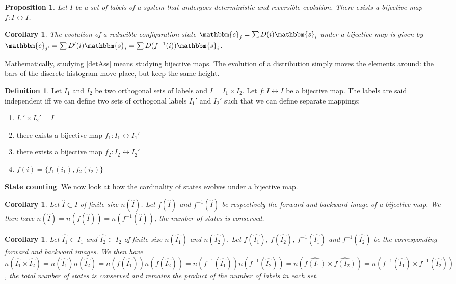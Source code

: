 \documentclass[twocolumn,floatfix,nofootinbib]{revtex4}   %
\theoremstyle{theorem}
\newtheorem{cor}[thm]{Corollary}
\newtheorem{prop}[thm]{Proposition}
\theoremstyle{definition}
\newtheorem{defn}[thm]{Definition}
\begin{document}
\begin{prop}\label{detMap}
Let $I$ be a set of labels of a system that undergoes deterministic and reversible evolution. There exists a bijective map $f:I \leftrightarrow I$.
\end{prop}

\begin{cor}\label{discreteEv}
The evolution of a reducible configuration state $\mathbbm{c}_j=\sum D(i) \mathbbm{s}_i$ under a bijective map is given by $\mathbbm{c}_{j'}=\sum D'(i) \mathbbm{s}_{i}=\sum D(f^{-1}(i)) \mathbbm{s}_{i}$.
\end{cor}

Mathematically, studying \ref{detAss} means studying bijective maps. The evolution of a distribution simply moves the elements around: the bars of the discrete histogram move place, but keep the same height.

\begin{defn}\label{labelsIndep}
Let $I_1$ and $I_2$ be two orthogonal sets of labels and $I = I_1 \times I_2$. Let $f:I \leftrightarrow I$ be a bijective map. The labels are said independent iff we can define two sets of orthogonal labels $I_1'$ and $I_2'$ such that we can define separate mappings:
\begin{enumerate}
\item $I_1' \times I_2' = I$
\item there exists a bijective map $f_1: I_1 \leftrightarrow I_1'$
\item there exists a bijective map $f_2: I_2 \leftrightarrow I_2'$
\item $f(i) = \{f_1(i_1), f_2(i_2)\}$
\end{enumerate}
\end{defn}

\textbf{State counting}. We now look at how the cardinality of states evolves under a bijective map.

\begin{cor}\label{labelsCount}
Let $\hat{I} \subset I$ of finite size $n(\hat{I})$. Let $f(\hat{I})$ and $f^{-1}(\hat{I})$ be respectively the forward and backward image of a bijective map. We then have $n(\hat{I})=n(f(\hat{I}))=n(f^{-1}(\hat{I}))$, the number of states is conserved.
\end{cor}

\begin{cor}\label{labelsMultiCount}
Let $\hat{I_1} \subset I_1$ and $\hat{I_2} \subset I_2$ of finite size $n(\hat{I_1})$ and $n(\hat{I_2})$. Let $f(\hat{I_1})$, $f(\hat{I_2})$, $f^{-1}(\hat{I_1})$ and $f^{-1}(\hat{I_2})$ be the corresponding forward and backward images. We then have $n(\hat{I_1}\times\hat{I_2})=n(\hat{I_1})n(\hat{I_2})=n(f(\hat{I_1})) n(f(\hat{I_2}))=n(f^{-1}(\hat{I_1})) n(f^{-1}(\hat{I_2}))=n(\hat{f(I_1)}\times\hat{f(I_2)})=n(f^{-1}(\hat{I_1})\times f^{-1}(\hat{I_2}))$, the total number of states is conserved and remains the product of the number of labels in each set.
\end{cor}
\end{document}
